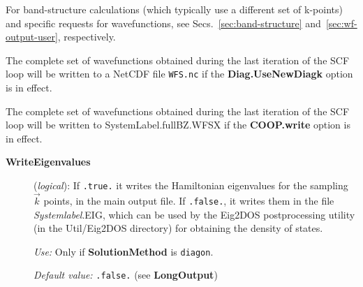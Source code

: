 \documentclass[11pt]{article}
\begin{document}
For band-structure calculations (which typically use a different set
of k-points) and specific requests for wavefunctions, see
Secs.~\ref{sec:band-structure} and~\ref{sec:wf-output-user}, respectively.

The complete set of wavefunctions obtained during the last
iteration of the SCF loop will be written to a NetCDF file
{\tt WFS.nc} if the {\bf Diag.UseNewDiagk} option is in effect.

The complete set of wavefunctions obtained during the last
iteration of the SCF loop will be written to SystemLabel.fullBZ.WFSX
if the {\bf COOP.write} option is in effect.

\begin{description}
\item[{\bf WriteEigenvalues}] ({\it logical}):
If {\tt .true.} it writes the Hamiltonian eigenvalues for the sampling
$\vec k$ points, in the main output file.
If {\tt .false.}, it writes them in the file {\it Systemlabel}.EIG,
which can be used by the {\sc Eig2DOS} postprocessing
utility (in the Util/Eig2DOS directory) for obtaining the density of
states.

{\it Use:} Only if {\bf SolutionMethod} is {\tt diagon}.

{\it Default value:} {\tt .false.} (see {\bf LongOutput})

\end{description}
\end{document}
